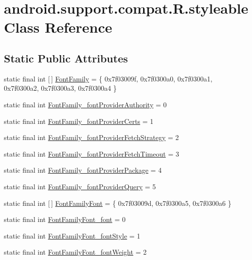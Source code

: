 \hypertarget{classandroid_1_1support_1_1compat_1_1R_1_1styleable}{}\section{android.\+support.\+compat.\+R.\+styleable Class Reference}
\label{classandroid_1_1support_1_1compat_1_1R_1_1styleable}
\subsection*{Static Public Attributes}
\begin{DoxyCompactItemize}
\item 
static final int \mbox{[}$\,$\mbox{]} \mbox{\hyperlink{classandroid_1_1support_1_1compat_1_1R_1_1styleable_abb9d6768feb73ebc5eb00aa944cde5cd}{Font\+Family}} = \{ 0x7f03009f, 0x7f0300a0, 0x7f0300a1, 0x7f0300a2, 0x7f0300a3, 0x7f0300a4 \}
\item 
static final int \mbox{\hyperlink{classandroid_1_1support_1_1compat_1_1R_1_1styleable_a79aa91648cdc2eb4f7c8638b4a03ce58}{Font\+Family\+\_\+font\+Provider\+Authority}} = 0
\item 
static final int \mbox{\hyperlink{classandroid_1_1support_1_1compat_1_1R_1_1styleable_ad5b1b877aab2bc12d0509032d17c28ca}{Font\+Family\+\_\+font\+Provider\+Certs}} = 1
\item 
static final int \mbox{\hyperlink{classandroid_1_1support_1_1compat_1_1R_1_1styleable_a0c3689e4bcd35b8d8cec425bbfb7a24b}{Font\+Family\+\_\+font\+Provider\+Fetch\+Strategy}} = 2
\item 
static final int \mbox{\hyperlink{classandroid_1_1support_1_1compat_1_1R_1_1styleable_ae1f72343c44ad91714a7d4be3ca60310}{Font\+Family\+\_\+font\+Provider\+Fetch\+Timeout}} = 3
\item 
static final int \mbox{\hyperlink{classandroid_1_1support_1_1compat_1_1R_1_1styleable_a5462df624de1f9ad89e776c875bfd219}{Font\+Family\+\_\+font\+Provider\+Package}} = 4
\item 
static final int \mbox{\hyperlink{classandroid_1_1support_1_1compat_1_1R_1_1styleable_aa23d02aec92c84ae6af10f4884ae45d5}{Font\+Family\+\_\+font\+Provider\+Query}} = 5
\item 
static final int \mbox{[}$\,$\mbox{]} \mbox{\hyperlink{classandroid_1_1support_1_1compat_1_1R_1_1styleable_a751b3f66192df6e0e2ae522e910b0a9c}{Font\+Family\+Font}} = \{ 0x7f03009d, 0x7f0300a5, 0x7f0300a6 \}
\item 
static final int \mbox{\hyperlink{classandroid_1_1support_1_1compat_1_1R_1_1styleable_a320db2192203cbfd8a00d17096de0305}{Font\+Family\+Font\+\_\+font}} = 0
\item 
static final int \mbox{\hyperlink{classandroid_1_1support_1_1compat_1_1R_1_1styleable_aad9bcc3dabdebc9e742a2c88c419bcd0}{Font\+Family\+Font\+\_\+font\+Style}} = 1
\item 
static final int \mbox{\hyperlink{classandroid_1_1support_1_1compat_1_1R_1_1styleable_abe914cf7b1d07e59e4c8216fac03d2f8}{Font\+Family\+Font\+\_\+font\+Weight}} = 2
\end{DoxyCompactItemize}


